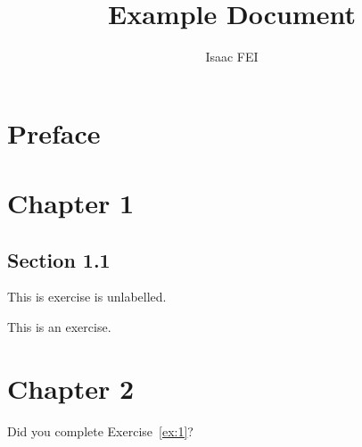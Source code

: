 \documentclass[thmcnt=section, color=blue, 12pt]{my-elegantbook}
\title{Example Document}
\author{Isaac FEI}
\begin{document}
\maketitle


\frontmatter
\chapter*{Preface}



\tableofcontents
\mainmatter


\chapter{Chapter 1}

\section{Section 1.1}

\begin{exercise}
    This is exercise is unlabelled.
\end{exercise}

\begin{exercise} \label{ex:1}
    This is an exercise.
\end{exercise}

\chapter{Chapter 2}

Did you complete Exercise~\ref{ex:1}?
\end{document}
